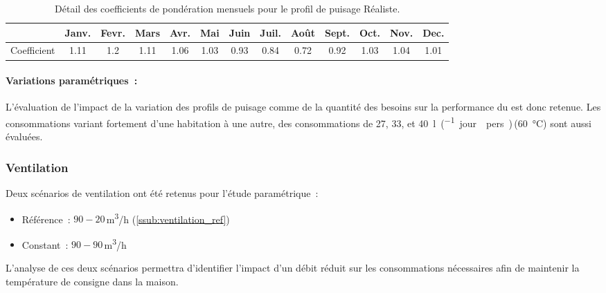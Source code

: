 \begin{table}
\centering
\caption[Détail des coefficients de pondération mensuels pour le profil de puisage Réaliste]
        {Détail des coefficients de pondération mensuels pour le profil de
         puisage Réaliste.}
\label{tab:coef_mois}
\begin{tabular}{l*{12}{c}}
    \toprule
                & Janv. & Fevr. & Mars & Avr. & Mai & Juin & Juil. & Août & Sept. & Oct. & Nov. & Dec. \\
    \midrule
    Coefficient & \num{1.11}   & \num{1.2}   & \num{1.11}  & \num{1.06}  & \num{1.03}  & \num{0.93}   & \num{0.84}    & \num{0.72}   & \num{0.92}    & \num{1.03}  & \num{1.04}  & \num{1.01}  \\
    \bottomrule
\end{tabular}
\end{table}

\paragraph{Variations paramétriques~:} %
\label{par:variations_parametriques}
L’évaluation de l’impact de la variation des profils de puisage comme de la quantité des
besoins sur la performance du  est donc retenue. Les consommations variant fortement
d’une habitation à une autre, des consommations de \num{27}, \num{33}, et
\SI{40}{\litre\per(jour \period  pers)}\,(\SI{60}{\celsius}) sont aussi évaluées.


\subsubsection{Ventilation} %
\label{ssub:ventilation}
Deux scénarios de ventilation ont été retenus pour l’étude paramétrique~:
\begin{itemize}
    \item Référence~: $90-20$\,\si[per-mode=symbol]{\meter\cubed\per\hour} (\ref{ssub:ventilation_ref})
    \item Constant~: $90-90$\,\si[per-mode=symbol]{\meter\cubed\per\hour}
\end{itemize}
L’analyse de ces deux scénarios permettra d’identifier l’impact d’un débit réduit sur
les consommations nécessaires afin de maintenir la température de consigne dans la
maison.



